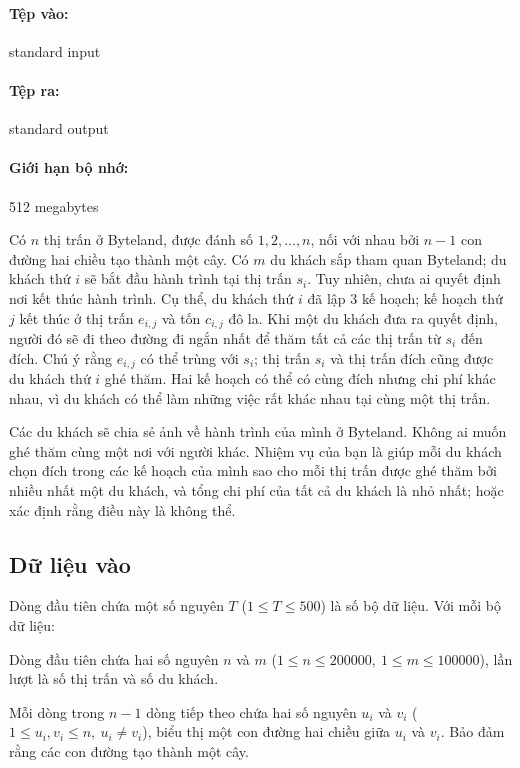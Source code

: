 \documentclass[11pt]{article}
\begin{document}
\paragraph{Tệp vào:} standard input
\paragraph{Tệp ra:} standard output
\paragraph{Giới hạn bộ nhớ:} 512 megabytes

Có \(n\) thị trấn ở Byteland, được đánh số \(1,2,\ldots,n\), nối với nhau
bởi \(n-1\) con đường hai chiều tạo thành một cây. Có \(m\) du khách sắp tham
quan Byteland; du khách thứ \(i\) sẽ bắt đầu hành trình tại thị trấn
\(s_i\). Tuy nhiên, chưa ai quyết định nơi kết thúc hành trình. Cụ thể, du
khách thứ \(i\) đã lập \(3\) kế hoạch; kế hoạch thứ \(j\) kết thúc ở thị trấn
\(e_{i,j}\) và tốn \(c_{i,j}\) đô la. Khi một du khách đưa ra quyết định,
người đó sẽ đi theo đường đi ngắn nhất để thăm tất cả các thị trấn từ
\(s_i\) đến đích. Chú ý rằng \(e_{i,j}\) có thể trùng với \(s_i\); thị trấn
\(s_i\) và thị trấn đích cũng được du khách thứ \(i\) ghé thăm. Hai kế hoạch
có thể có cùng đích nhưng chi phí khác nhau, vì du khách có thể làm những
việc rất khác nhau tại cùng một thị trấn.

Các du khách sẽ chia sẻ ảnh về hành trình của mình ở Byteland. Không ai muốn
ghé thăm cùng một nơi với người khác. Nhiệm vụ của bạn là giúp mỗi du khách
chọn đích trong các kế hoạch của mình sao cho mỗi thị trấn được ghé thăm bởi
nhiều nhất một du khách, và tổng chi phí của tất cả du khách là nhỏ nhất;
hoặc xác định rằng điều này là không thể.

\subsection*{Dữ liệu vào}

Dòng đầu tiên chứa một số nguyên \(T\) (\(1\le T\le 500\)) là số bộ dữ liệu.
Với mỗi bộ dữ liệu:

Dòng đầu tiên chứa hai số nguyên \(n\) và \(m\)
(\(1\le n\le 200000,\ 1\le m\le 100000\)), lần lượt là số thị trấn và số du
khách.

Mỗi dòng trong \(n-1\) dòng tiếp theo chứa hai số nguyên \(u_i\) và \(v_i\)
(\(1\le u_i,v_i\le n,\ u_i\ne v_i\)), biểu thị một con đường hai chiều giữa
\(u_i\) và \(v_i\). Bảo đảm rằng các con đường tạo thành một cây.
\end{document}
